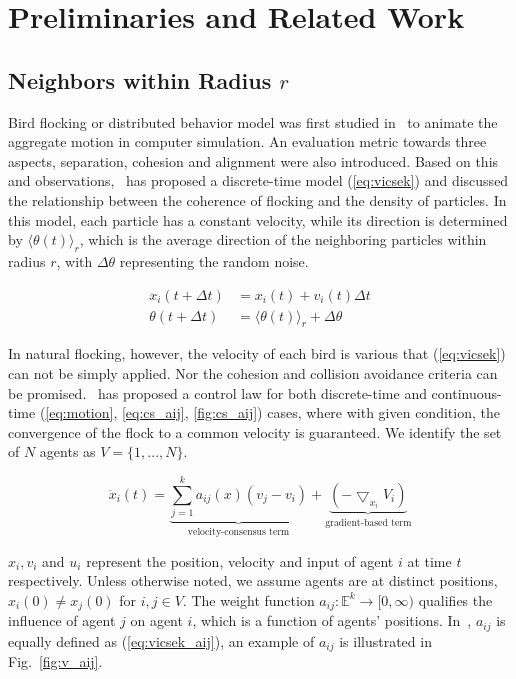 \chapter{Preliminaries and Related Work}\label{preliminaries}

\section{Neighbors within Radius $r$}\label{flocking}

Bird flocking or distributed behavior model was first studied in~\cite{Reynolds1987} to animate the aggregate motion in computer simulation. An evaluation metric towards three aspects, separation, cohesion and alignment were also introduced. Based on this and observations,~\cite{Vicsek1995} has proposed a discrete-time model (\ref{eq:vicsek}) and discussed the relationship between the coherence of flocking and the density of particles. In this model, each particle has a constant velocity, while its direction is determined by ${\langle\theta(t)\rangle}_r$, which is the average direction of the neighboring particles within radius $r$, with $\Delta\theta$ representing the random noise.

\begin{equation}\label{eq:vicsek}
\begin{aligned}
x_i(t+\Delta t)&=x_i(t)+v_i(t)\Delta t\\
\theta(t+\Delta t)&={\langle\theta(t)\rangle}_r+\Delta\theta
\end{aligned}
\end{equation}

In natural flocking, however, the velocity of each bird is various that (\ref{eq:vicsek}) can not be simply applied. Nor the cohesion and collision avoidance criteria can be promised.~\cite{CuckerSmale2007} has proposed a control law for both discrete-time and continuous-time (\ref{eq:motion}, \ref{eq:cs_aij}, \ref{fig:cs_aij}) cases, where with given condition, the convergence of the flock to a common velocity is guaranteed. We identify the set of $N$ agents as $V=\{1,...,N\}$.

\begin{equation}\label{eq:motion}
\ddot{x}_i(t)=\underbrace{\sum^k_{j=1}a_{ij}(x)(v_j-v_i)}_{\text{velocity-consensus term}}+\underbrace{(-\bigtriangledown_{x_i}V_i)}_{\text{gradient-based term}}
\end{equation}

\noindent
$x_i, v_i$ and $u_i$ represent the position, velocity and input of agent $i$ at time $t$ respectively. Unless otherwise noted, we assume agents are at distinct positions, $x_i(0)\neq x_j(0)$ for $i, j\in V$. The weight function $a_{ij}:\mathbb{E}^k\to[0,\infty)$ qualifies the influence of agent $j$ on agent $i$, which is a function of agents' positions. In~\cite{Vicsek1995}, $a_{ij}$ is equally defined as (\ref{eq:vicsek_aij}), an example of $a_{ij}$ is illustrated in Fig.~\ref{fig:v_aij}.

